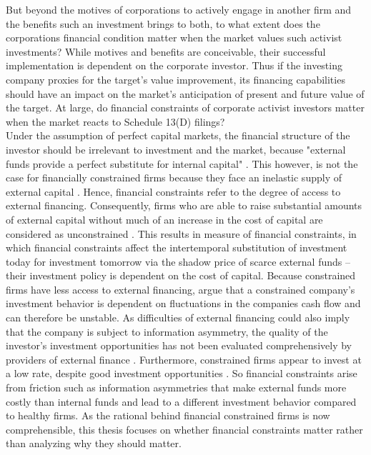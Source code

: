 \documentclass[12pt]{article}
\begin{document}
But beyond the motives of corporations to actively engage in another firm and the benefits such an investment brings to both, to what extent does the corporations financial condition matter when the market values such activist investments?  While motives and benefits are conceivable, their successful implementation is dependent on the corporate investor. 
Thus if the investing company proxies for the target's value improvement, its financing capabilities should have an impact on the market's anticipation of present and future value of the target. At large, do financial constraints of corporate activist investors matter when the market reacts to Schedule 13(D) filings?\\
Under the assumption of perfect capital markets, the financial structure of the investor should be irrelevant to investment and the market, because "external funds provide a perfect substitute for internal capital" \citep[p. 141]{Fazzari2016}. This however, is not the case for financially constrained firms because they face an inelastic supply of external capital \citep[p.1]{Farre-mensa2013}. Hence, financial constraints refer to the degree of access to external financing. Consequently, firms who are able to raise substantial amounts of external capital without much of an increase in the cost of capital are considered as unconstrained \citep[p.1]{Farre-mensa2013}. This results in \citet[p.531]{Whited2006} measure of financial constraints, in which financial constraints affect the intertemporal substitution of investment today for investment tomorrow via the shadow price of scarce external funds -- their investment policy is dependent on the cost of capital. Because constrained firms have less access to external financing, \citet[p. 142]{Fazzari1988} argue that a constrained company's investment behavior is dependent on fluctuations in the companies cash flow and can therefore be unstable. As difficulties of external financing could also imply that the company is subject to information asymmetry, the quality of the investor's investment opportunities has not been evaluated comprehensively by providers of external finance \citep[p.142]{Fazzari1988}. Furthermore, constrained firms appear to invest at a low rate, despite good investment opportunities \citep[p.533]{Whited2006}. 
So financial constraints arise from friction such as information asymmetries that make external funds more costly than internal funds and lead to a different investment behavior compared to healthy firms. As the rational behind financial constrained firms is now comprehensible, this thesis focuses on whether financial constraints matter rather than analyzing why they should matter. 
\end{document}
